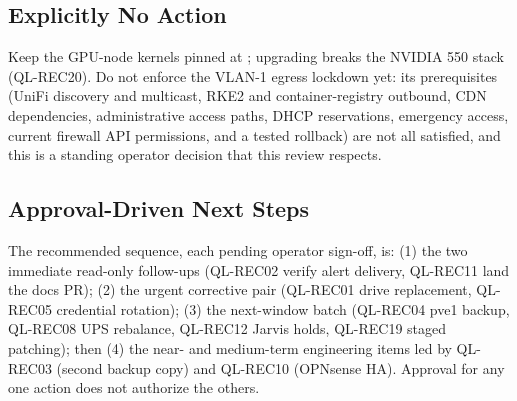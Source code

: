 \subsection{Explicitly No Action}

Keep the GPU-node kernels pinned at ; upgrading breaks the NVIDIA 550 stack (QL-REC20). Do not enforce the VLAN-1 egress lockdown yet: its prerequisites (UniFi discovery and multicast, RKE2 and container-registry outbound, CDN dependencies, administrative access paths, DHCP reservations, emergency access, current firewall API permissions, and a tested rollback) are not all satisfied, and this is a standing operator decision that this review respects.

\subsection{Approval-Driven Next Steps}

The recommended sequence, each pending operator sign-off, is: (1) the two immediate read-only follow-ups (QL-REC02 verify alert delivery, QL-REC11 land the docs PR); (2) the urgent corrective pair (QL-REC01 drive replacement, QL-REC05 credential rotation); (3) the next-window batch (QL-REC04 pve1 backup, QL-REC08 UPS rebalance, QL-REC12 Jarvis holds, QL-REC19 staged patching); then (4) the near- and medium-term engineering items led by QL-REC03 (second backup copy) and QL-REC10 (OPNsense HA). Approval for any one action does not authorize the others.
